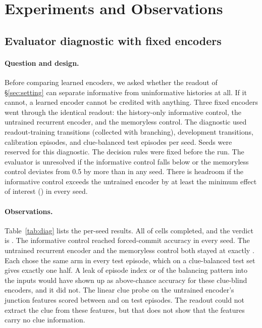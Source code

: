 \section{Experiments and Observations}
\label{sec:experiments}

\subsection{Evaluator diagnostic with fixed encoders}
\label{sec:diag}

\paragraph{Question and design.}
Before comparing learned encoders, we asked whether the readout of \S\ref{sec:setting} can separate informative from uninformative histories at all. If it cannot, a learned encoder cannot be credited with anything. Three fixed encoders went through the identical readout: the history-only informative control, the untrained recurrent encoder, and the memoryless control. The diagnostic used \DiagCfgTrainBudget{} readout-training transitions (collected with branching), \DiagCfgDevBudget{} development transitions, \DiagCfgNCalib{} calibration episodes, and \DiagCfgNTest{} clue-balanced test episodes per seed. Seeds \DiagSeeds{} were reserved for this diagnostic. The decision rules were fixed before the run. The evaluator is unresolved if the informative control falls below \DiagCfgPosMin{} or the memoryless control deviates from 0.5 by more than \DiagCfgNegDev{} in any seed. There is headroom if the informative control exceeds the untrained encoder by at least the minimum effect of interest (\DiagCfgMIE) in every seed.

\paragraph{Observations.}
Table~\ref{tab:diag} lists the per-seed results. All \DiagNumOK{} of \DiagNumCells{} cells completed, and the verdict is \DiagVerdict{}. The informative control reached forced-commit accuracy \DiagForcedInfoMin{} in every seed. The untrained recurrent encoder and the memoryless control both stayed at exactly \DiagForcedRandMax{}. Each chose the same arm in every test episode, which on a clue-balanced test set gives exactly one half. A leak of episode index or of the balancing pattern into the inputs would have shown up as above-chance accuracy for these clue-blind encoders, and it did not. The linear clue probe on the untrained encoder's junction features scored between \DiagProbeRandMin{} and \DiagProbeRandMax{} on test episodes. The readout could not extract the clue from these features, but that does not show that the features carry no clue information.

